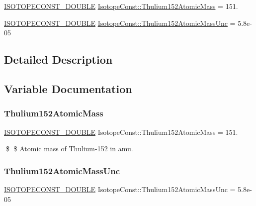 \begin{DoxyCompactItemize}
\item 
\mbox{\hyperlink{group___isotope_const-_macros_ga8f45a7272ce02c0b4c65c44636ed719a}{I\+S\+O\+T\+O\+P\+E\+C\+O\+N\+S\+T\+\_\+\+D\+O\+U\+B\+LE}} \mbox{\hyperlink{group___isotope_const-_thulium-_tm152_ga381aedaebbe28cc3660739285059fba2}{Isotope\+Const\+::\+Thulium152\+Atomic\+Mass}} = 151.
\item 
\mbox{\hyperlink{group___isotope_const-_macros_ga8f45a7272ce02c0b4c65c44636ed719a}{I\+S\+O\+T\+O\+P\+E\+C\+O\+N\+S\+T\+\_\+\+D\+O\+U\+B\+LE}} \mbox{\hyperlink{group___isotope_const-_thulium-_tm152_ga1370820bed04fc5dcce9c2891b88894d}{Isotope\+Const\+::\+Thulium152\+Atomic\+Mass\+Unc}} = 5.\+8e-\/05
\end{DoxyCompactItemize}


\subsection{Detailed Description}


\subsection{Variable Documentation}
\mbox{\label{group___isotope_const-_thulium-_tm152_ga381aedaebbe28cc3660739285059fba2}} 
\subsubsection{\texorpdfstring{Thulium152\+Atomic\+Mass}{Thulium152AtomicMass}}
{\footnotesize\ttfamily \mbox{\hyperlink{group___isotope_const-_macros_ga8f45a7272ce02c0b4c65c44636ed719a}{I\+S\+O\+T\+O\+P\+E\+C\+O\+N\+S\+T\+\_\+\+D\+O\+U\+B\+LE}} Isotope\+Const\+::\+Thulium152\+Atomic\+Mass = 151.}

\$ \$ Atomic mass of Thulium-\/152 in amu. \mbox{\label{group___isotope_const-_thulium-_tm152_ga1370820bed04fc5dcce9c2891b88894d}} 
\subsubsection{\texorpdfstring{Thulium152\+Atomic\+Mass\+Unc}{Thulium152AtomicMassUnc}}
{\footnotesize\ttfamily \mbox{\hyperlink{group___isotope_const-_macros_ga8f45a7272ce02c0b4c65c44636ed719a}{I\+S\+O\+T\+O\+P\+E\+C\+O\+N\+S\+T\+\_\+\+D\+O\+U\+B\+LE}} Isotope\+Const\+::\+Thulium152\+Atomic\+Mass\+Unc = 5.\+8e-\/05}

